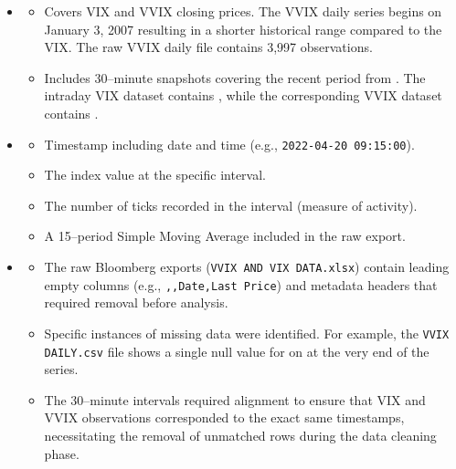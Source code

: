 \documentclass[12pt,a4paper]{report}
\numberwithin{equation}{section}
\begin{document}
\begin{itemize}
    \item {}
    \begin{itemize}
        \item {} Covers VIX and VVIX closing prices. The VVIX daily series begins on January 3, 2007 resulting in a shorter historical range compared to the VIX.
        The raw VVIX daily file contains 3,997 observations.
        \item {} Includes 30--minute snapshots covering the recent period from . The intraday VIX dataset contains , while the corresponding VVIX dataset contains .
    \end{itemize}

    \item {}
    \begin{itemize}
        \item {} Timestamp including date and time (e.g., \texttt{2022-04-20 09:15:00}).
        \item {} The index value at the specific interval.
        \item {} The number of ticks recorded in the interval (measure of activity).
        \item {} A 15--period Simple Moving Average included in the raw export.
    \end{itemize}

    \item {}
    \begin{itemize}
        \item {} The raw Bloomberg exports (\texttt{VVIX AND VIX DATA.xlsx}) contain leading empty columns (e.g., \texttt{,,Date,Last Price}) and metadata headers that required removal before analysis.
        \item {} Specific instances of missing data were identified. For example, the \texttt{VVIX DAILY.csv} file shows a single null value for  on  at the very end of the series.
        \item {} The 30--minute intervals required alignment to ensure that VIX and VVIX observations corresponded to the exact same timestamps, necessitating the removal of unmatched rows during the data cleaning phase.
    \end{itemize}
\end{itemize}
\end{document}
